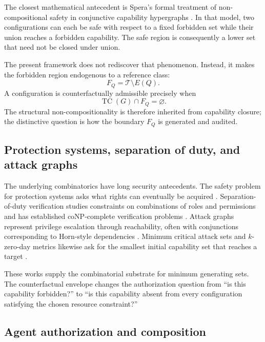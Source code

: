 \documentclass[11pt]{article}
\newcommand{\TC}{\operatorname{TC}}
\newcommand{\Tset}{\mathcal T}
\begin{document}
The closest mathematical antecedent is Spera's formal treatment of non-compositional safety in conjunctive capability hypergraphs \cite{spera2026}. In that model, two configurations can each be safe with respect to a fixed forbidden set while their union reaches a forbidden capability. The safe region is consequently a lower set that need not be closed under union.

The present framework does not rediscover that phenomenon. Instead, it makes the forbidden region endogenous to a reference class:
\[
F_Q=\Tset\setminus E(Q).
\]
A configuration is counterfactually admissible precisely when
\[
\TC(G)\cap F_Q=\varnothing.
\]
The structural non-compositionality is therefore inherited from capability closure; the distinctive question is how the boundary $F_Q$ is generated and audited.

\subsection{Protection systems, separation of duty, and attack graphs}

The underlying combinatorics have long security antecedents. The safety problem for protection systems asks what rights can eventually be acquired \cite{harrison1976}. Separation-of-duty verification studies constraints on combinations of roles and permissions and has established coNP-complete verification problems \cite{li2007}. Attack graphs represent privilege escalation through reachability, often with conjunctions corresponding to Horn-style dependencies \cite{sheyner2002,ou2005,jha2002}. Minimum critical attack sets and $k$-zero-day metrics likewise ask for the smallest initial capability set that reaches a target \cite{jha2002,pamula2006,wang2014}.

These works supply the combinatorial substrate for minimum generating sets. The counterfactual envelope changes the authorization question from ``is this capability forbidden?'' to ``is this capability absent from every configuration satisfying the chosen resource constraint?''

\subsection{Agent authorization and composition}
\end{document}
